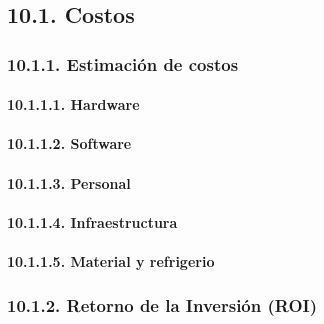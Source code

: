 \subsection{10.1. Costos}\label{sec:cap10_costos}

\subsubsection{10.1.1. Estimación de costos}\label{sec:cap10_estimacion}

\paragraph{10.1.1.1. Hardware}\label{sec:cap10_hardware}


\paragraph{10.1.1.2. Software}\label{sec:cap10_software}


\paragraph{10.1.1.3. Personal}\label{sec:cap10_personal}


\paragraph{10.1.1.4. Infraestructura}\label{sec:cap10_infraestructura}


\paragraph{10.1.1.5. Material y refrigerio}\label{sec:cap10_material}


\subsubsection{10.1.2. Retorno de la Inversión (ROI)}\label{sec:cap10_roi}

